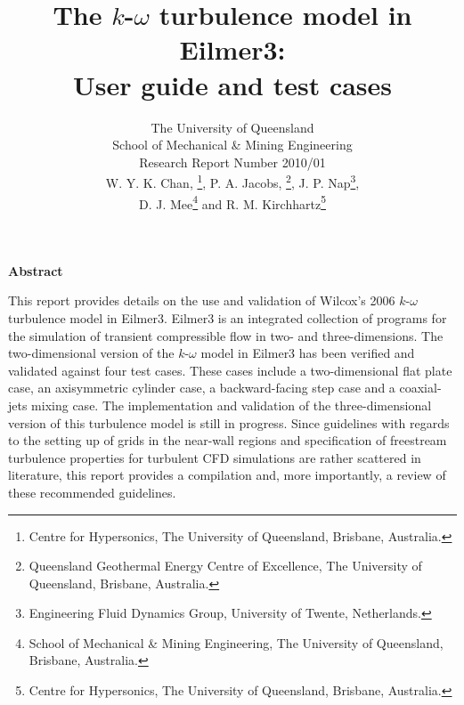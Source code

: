 \documentclass[12pt,a4paper]{article}
\title{
    The $k$-$\omega$ turbulence model in Eilmer3: \\
    User guide and test cases
}
\author{
    The University of Queensland \\
    School of Mechanical \& Mining Engineering \\
    Research Report Number 2010/01 
    \vspace{0.5cm} \\
    W. Y. K. Chan, \thanks{Centre for Hypersonics, The University of 
     Queensland, Brisbane, Australia.}, 
    P. A. Jacobs, \thanks{Queensland Geothermal Energy Centre of 
     Excellence, The University of Queensland, Brisbane, Australia.}, 
    J. P. Nap\thanks{Engineering Fluid Dynamics Group, University of Twente, Netherlands.}, \\ 
    D. J. Mee\thanks{School of Mechanical \& Mining Engineering, 
     The University of Queensland, Brisbane, Australia.} and 
    R. M. Kirchhartz\thanks{Centre for Hypersonics, The University of
     Queensland, Brisbane, Australia.} \\
}
\begin{document}
\maketitle

\centerline{\textbf{Abstract}}
\medskip
This report provides details on the use and validation of Wilcox's
2006 $k$-$\omega$ turbulence model in Eilmer3. Eilmer3 is an integrated
collection of programs for the simulation of transient compressible flow
in two- and three-dimensions\cite{Jacobs2008,Jacobs2010}. The two-dimensional 
version of the $k$-$\omega$ model in Eilmer3 has been verified and
validated against four test cases. These cases include a two-dimensional 
flat plate case, an axisymmetric cylinder case, a backward-facing step
case and a coaxial-jets mixing case. The implementation and validation of
the three-dimensional version of this turbulence model is still in
progress. Since guidelines with regards to the setting up of grids in the
near-wall regions and specification of freestream turbulence properties 
for turbulent CFD simulations are rather scattered in literature, this 
report provides a compilation and, more importantly, a review of these 
recommended guidelines. 
\newpage
\tableofcontents











\newpage

%

%

\newpage
\appendix
\end{document}

